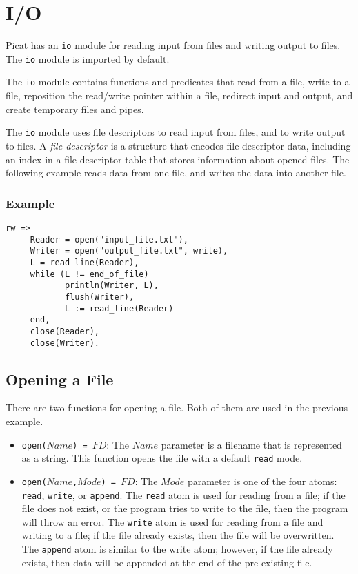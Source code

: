 \chapter{\label{chapter:io}I/O}
Picat has an \texttt{io} module for reading input from files and writing output to files.  The \texttt{io} module is imported by default.

The \texttt{io} module contains functions and predicates that read from a file, write to a file, reposition the read/write pointer within a file, redirect input and output, and create temporary files and pipes.

The \texttt{io} module uses file descriptors to read input from files, and to write output to files.  A \emph{file descriptor} is a structure that encodes file descriptor data, including an index in a file descriptor table that stores information about opened files.  The following example reads data from one file, and writes the data into another file.

\subsection*{Example}
\begin{verbatim}
rw =>
     Reader = open("input_file.txt"),
     Writer = open("output_file.txt", write),
     L = read_line(Reader),
     while (L != end_of_file)
            println(Writer, L),
            flush(Writer),
            L := read_line(Reader)
     end,
     close(Reader),
     close(Writer).
\end{verbatim}

\section{Opening a File}
There are two functions for opening a file.  Both of them are used in the previous example.
\begin{itemize}
\item \texttt{open($Name$) = $FD$}: The $Name$ parameter is a filename that is represented as a string.  This function opens the file with a default \texttt{read} mode.
\item \texttt{open($Name$,$Mode$) = $FD$}: The $Mode$ parameter is one of the four atoms: \texttt{read}, \texttt{write}, or \texttt{append}.  The \texttt{read} atom is used for reading from a file; if the file does not exist, or the program tries to write to the file, then the program will throw an error.  The \texttt{write} atom is used for reading from a file and writing to a file; if the file already exists, then the file will be overwritten.  The \texttt{append} atom is similar to the write atom; however, if the file already exists, then data will be appended at the end of the pre-existing file.  
\end{itemize}

